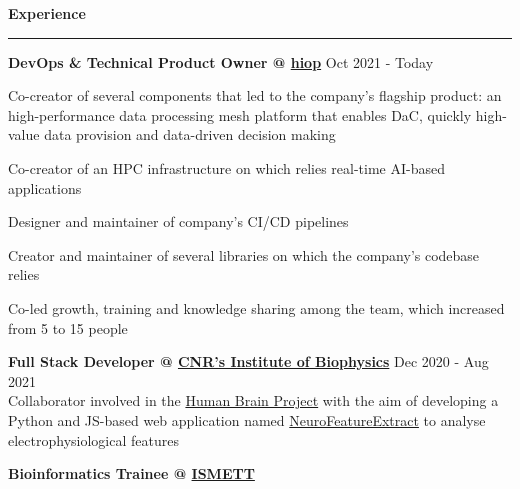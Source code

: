 \documentclass[11pt,letterpaper]{article}
\begin{document}
\begin{justify}
		{\large \textbf{Experience} \strut}
	\vspace{0.03cm}
	\hrule
	\begin{itemize}[label={}, leftmargin=0pt]
		\begin{item}
		      \textbf{DevOps \& Technical Product Owner @ \href{https://hiop.io/}{hiop}}
		      \hfill
		      Oct 2021 - Today
		      \vspace{-0.15cm}
		      \begin{itemize}[label={$\bullet$}, leftmargin=12.5pt, noitemsep]
			      \begin{item}
			            Co-creator of several components that led to the company's flagship product: an high-performance data processing mesh platform that enables DaC, quickly high-value data provision and data-driven decision making
			      \end{item}
			      \begin{item}
			            Co-creator of an HPC infrastructure on which relies real-time AI-based applications
			      \end{item}
			      \begin{item}
			            Designer and maintainer of company's CI/CD pipelines
			      \end{item}
			      \begin{item}
			            Creator and maintainer of several libraries on which the company's codebase relies
			      \end{item}
			      \begin{item}
			            Co-led growth, training and knowledge sharing among the team, which increased from 5 to 15 people
			      \end{item}
		      \end{itemize}
		\end{item}
		\begin{item}
		      \textbf{Full Stack Developer @ \href{https://www.ibf.cnr.it}{CNR’s Institute of Biophysics}}
		      \hfill
		      Dec 2020 - Aug 2021
		      \vspace{0.05cm}
		      \\
		      Collaborator involved in the \href{https://www.humanbrainproject.eu/en/}{Human Brain Project} with the aim of developing a Python and JS-based web application named \href{https://hbp-bsp-hhnb.cineca.it/efelg/}{NeuroFeatureExtract} to analyse electrophysiological features
		\end{item}
		\begin{item}
		      \textbf{Bioinformatics Trainee @ \href{https://www.ismett.edu/en/}{ISMETT}}

\end{item}
\end{itemize}
\end{justify}
\end{document}
